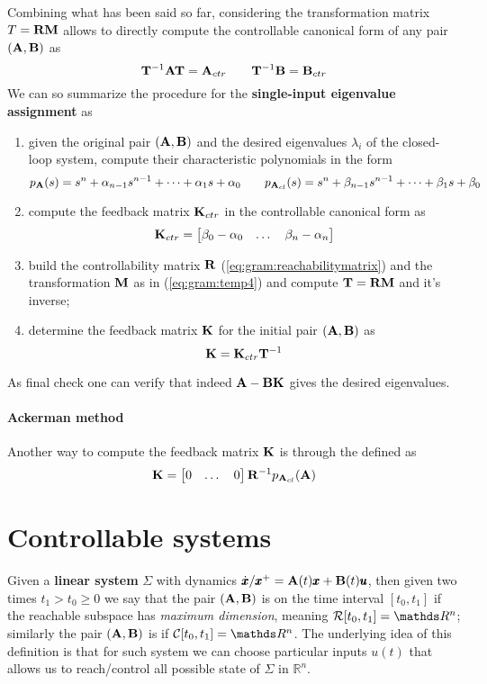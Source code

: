 	Combining what has been said so far, considering the transformation matrix $T =\mathbf{R}\mathbf{M}$ allows to directly compute the controllable canonical form of any pair $(\mathbf{A},\mathbf{B})$ as
	\[ \mathbf{T}^{-1} \mathbf{A} \mathbf{T} = \mathbf{A}_{ctr} \qquad \mathbf{T}^{-1} \mathbf{B}= \mathbf{B}_{ctr} \]
	We can so summarize the procedure for the \textbf{single-input eigenvalue assignment} as
	\begin{enumerate}
		\item given the original pair $(\mathbf{A},\mathbf{B})$ and the desired eigenvalues $\lambda_i$ of the closed-loop system, compute their characteristic polynomials in the form
		\[ p_{\mathbf{A}}(s) = s^n + \alpha_{n-1}s^{n-1} + \dots + \alpha_1 s + \alpha_0 \qquad p_{\mathbf{A}_{cl}}(s) = s^n + \beta_{n-1}s^{n-1} + \dots + \beta_1 s + \beta_0 \]
		\item compute the feedback matrix $\mathbf{K}_{ctr}$ in the controllable canonical form as
		\[ \mathbf{K}_{ctr} = \begin{bmatrix} \beta_0-\alpha_0 & \dots & \beta_n-\alpha_n \end{bmatrix} \]
		\item build the controllability matrix $\mathbf{R}$ (\ref{eq:gram:reachabilitymatrix}) and the transformation $\mathbf{M}$ as in (\ref{eq:gram:temp4}) and compute $\mathbf{T} = \mathbf{R} \mathbf{M}$ and it's inverse;
		\item determine the feedback matrix $\mathbf{K}$ for the initial pair $(\mathbf{A},\mathbf{B})$ as
		\[ \mathbf{K} = \mathbf{K}_{ctr} \mathbf{T}^{-1} \]		
	\end{enumerate}
	As final check one can verify that indeed $\mathbf{A}-\mathbf{B}\mathbf{K}$ gives the desired eigenvalues.
	
	\paragraph{Ackerman method} Another way to compute the feedback matrix $\mathbf{K}$ is through the  defined as
	\begin{equation}
		\mathbf{K} = \begin{bmatrix} 0 & \dots & 0 \end{bmatrix} \mathbf{R}^{-1} p_{\mathbf{A}_{cl}}(\mathbf{A})
	\end{equation}
	
\section{Controllable systems} \label{sec:controllablesystems}
	Given a \textbf{linear system} $\Sigma$ with dynamics $\dot{\pmb{x}}/\pmb{x}^+ = \mathbf{A}(t)\pmb{x} + \mathbf{B}(t) \pmb{u}$, then given two times $t_1>t_0 \geq 0$ we say that the pair $(\mathbf{A},\mathbf{B})$ is  on the time interval $[t_0,t_1]$ if the reachable subspace has \textit{maximum dimension}, meaning $\reach[t_0,t_1] = \mathds R^n$; similarly the pair $(\mathbf{A},\mathbf{B})$ is  if $\ctr[t_0,t_1] = \mathds R^n$. The underlying idea of this definition is that for such system we can choose particular inputs $u(t)$ that allows us to reach/control all possible state of $\Sigma$ in $\mathds R^n$.
	
